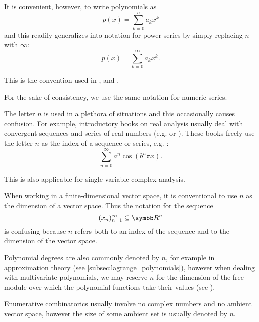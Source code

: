 \begin{enumerate}
\begin{itemize}
    It is convenient, however, to write polynomials as
    \begin{equation*}
      p(x) = \sum_{k=0}^n a_k x^k
    \end{equation*}
    and this readily generalizes into notation for power series by simply replacing \( n \) with \( \infty \):
    \begin{equation*}
      p(x) = \sum_{k=0}^\infty a_k x^k.
    \end{equation*}

    This is the convention used in \cite[9]{Knapp2016BAlg}, \cite[exercise 2.2]{Коцев2016} and \cite[]{Фихтенгольц1968/2}.

    For the sake of consistency, we use the same notation for numeric series.
  \end{itemize}

   The letter \( n \) is used in a plethora of situations and this occasionally causes confusion. For example, introductory books on real analysis usually deal with convergent sequences and series of real numbers (e.g. \cite[chapter 3]{Фихтенгольц1968/1} or \cite[chapter 15]{Фихтенгольц1968/2}). These books freely use the letter \( n \) as the index of a sequence or series, e.g. :
  \begin{equation*}
    \sum_{n=0}^\infty a^n \cos(b^n \pi x).
  \end{equation*}

  This is also applicable for single-variable complex analysis.

  When working in a finite-dimensional vector space, it is conventional to use \( n \) as the dimension of a vector space. Thus the notation for the sequence
  \begin{equation*}
    ( x_n )_{n=1}^\infty \subseteq \R^n
  \end{equation*}
  is confusing because \( n \) refers both to an index of the sequence and to the dimension of the vector space.

  Polynomial degrees are also commonly denoted by \( n \), for example in approximation theory (see \cref{subsec:lagrange_polynomials}), however when dealing with multivariate polynomials, we may reserve \( n \) for the dimension of the free module over which the polynomial functions take their values (see ).

  Enumerative combinatorics usually involve no complex numbers and no ambient vector space, however the size of some ambient set is usually denoted by \( n \).


\end{enumerate}
